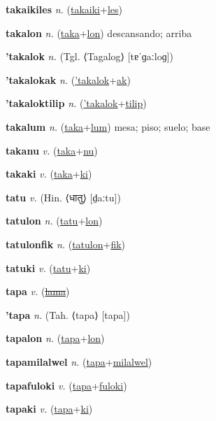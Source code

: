 \textbf{\hypertarget{takaikiles}{takaikiles}} \textit{n.} (\hyperlink{takaiki}{takaiki}+\allowbreak \hyperlink{les}{les})


\textbf{\hypertarget{takalon}{takalon}} \textit{n.} (\hyperlink{taka}{taka}+\allowbreak \hyperlink{lon}{lon})
descansando; arriba

\textbf{\hypertarget{'takalok}{'takalok}} \textit{n.} (Tgl. ⟨Tagalog⟩ [tɐˈɡaːloɡ])


\textbf{\hypertarget{'takalokak}{'takalokak}} \textit{n.} (\hyperlink{'takalok}{'takalok}+\allowbreak \hyperlink{ak}{ak})


\textbf{\hypertarget{'takaloktilip}{'takaloktilip}} \textit{n.} (\hyperlink{'takalok}{'takalok}+\allowbreak \hyperlink{tilip}{tilip})


\textbf{\hypertarget{takalum}{takalum}} \textit{n.} (\hyperlink{taka}{taka}+\allowbreak \hyperlink{lum}{lum})
mesa; piso; suelo; base

\textbf{\hypertarget{takanu}{takanu}} \textit{v.} (\hyperlink{taka}{taka}+\allowbreak \hyperlink{nu}{nu})


\textbf{\hypertarget{takaki}{takaki}} \textit{v.} (\hyperlink{taka}{taka}+\allowbreak \hyperlink{ki}{ki})


\textbf{\hypertarget{tatu}{tatu}} \textit{v.} (Hin. ⟨{\devanagari{}धातु}⟩ [d̤aːtu])


\textbf{\hypertarget{tatulon}{tatulon}} \textit{n.} (\hyperlink{tatu}{tatu}+\allowbreak \hyperlink{lon}{lon})


\textbf{\hypertarget{tatulonfik}{tatulonfik}} \textit{n.} (\hyperlink{tatulon}{tatulon}+\allowbreak \hyperlink{fik}{fik})


\textbf{\hypertarget{tatuki}{tatuki}} \textit{v.} (\hyperlink{tatu}{tatu}+\allowbreak \hyperlink{ki}{ki})


\textbf{\hypertarget{tapa}{tapa}} \textit{v.} (\hyperlink{lama}{\sout{lama}})


\textbf{\hypertarget{'tapa}{'tapa}} \textit{n.} (Tah. ⟨tapa⟩ [tapa])


\textbf{\hypertarget{tapalon}{tapalon}} \textit{n.} (\hyperlink{tapa}{tapa}+\allowbreak \hyperlink{lon}{lon})


\textbf{\hypertarget{tapamilalwel}{tapamilalwel}} \textit{n.} (\hyperlink{tapa}{tapa}+\allowbreak \hyperlink{milalwel}{milalwel})


\textbf{\hypertarget{tapafuloki}{tapafuloki}} \textit{v.} (\hyperlink{tapa}{tapa}+\allowbreak \hyperlink{fuloki}{fuloki})


\textbf{\hypertarget{tapaki}{tapaki}} \textit{v.} (\hyperlink{tapa}{tapa}+\allowbreak \hyperlink{ki}{ki})


